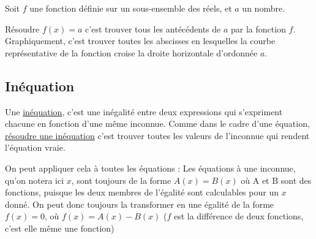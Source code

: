 \documentclass[10pt,a4paper]{book}
\begin{document}
Soit $f$ une fonction définie sur un sous-ensemble des réels, et $a$ un nombre.

\begin{minipage}{0.5\textwidth}  
Résoudre $f(x)=a$ c'est trouver tous les antécédents de $a$ par la fonction $f$.  
\newline ~ \newline
Graphiquement, c'est trouver toutes les abscisses en lesquelles la courbe représentative de la fonction croise la droite horizontale d'ordonnée $a$.
\end{minipage}
\begin{minipage}{0.35\textwidth}
\end{minipage}

\subsection{Inéquation}

\begin{de}
    Une \underline{inéquation}, c'est une inégalité entre deux expressions qui s'expriment chacune en fonction d'une même inconnue. Comme dans le cadre d'une équation, \underline{résoudre une inéquation} c'est trouver toutes les valeurs de l'inconnue qui rendent l'équation vraie.
\end{de}

On peut appliquer cela à toutes les équations : Les équations à une inconnue, qu'on notera ici $x$, sont toujours de la forme $A(x)=B(x)$ où A et B sont des fonctions, puisque les deux membres de l'égalité sont calculables pour un $x$ donné.
On peut donc toujours la transformer en une égalité de la forme $f(x)=0$, où $f(x)=A(x)-B(x)$  ($f$ est la différence de deux fonctions, c'est elle même une fonction)
\end{document}
